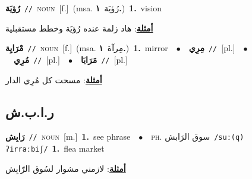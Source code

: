 \documentclass[10pt,a4paper,twoside]{article} %
\begin{document}
\begin{multicols}{2}
{{{{{\setlength\topsep{0pt}\textbf{\foreignlanguage{arabic}{رُؤيَة}}\ {\color{gray}\texttt{//}\color{black}}\ \textsc{noun}\ [f.]\ \color{gray}(msa. \foreignlanguage{arabic}{رُؤيَة}~\foreignlanguage{arabic}{\textbf{١.}})\color{black}\ \textbf{1.}~vision\  \begin{flushright}\color{gray}\foreignlanguage{arabic}{\textbf{\underline{\foreignlanguage{arabic}{أمثلة}}}: هاد زلمة عنده رُؤيَة وخطط مستقبلية}\end{flushright}\color{black}} \vspace{2mm}

{\setlength\topsep{0pt}\textbf{\foreignlanguage{arabic}{مْرَايِة}}\ {\color{gray}\texttt{//}\color{black}}\ \textsc{noun}\ [f.]\ \color{gray}(msa. \foreignlanguage{arabic}{مِرآة}~\foreignlanguage{arabic}{\textbf{١.}})\color{black}\ \textbf{1.}~mirror\ \ $\bullet$\ \ \setlength\topsep{0pt}\textbf{\foreignlanguage{arabic}{مِرِي}}\ {\color{gray}\texttt{//}\color{black}}\ [pl.]\ \ $\bullet$\ \ \setlength\topsep{0pt}\textbf{\foreignlanguage{arabic}{مُرِي}}\ {\color{gray}\texttt{//}\color{black}}\ [pl.]\ \ $\bullet$\ \ \setlength\topsep{0pt}\textbf{\foreignlanguage{arabic}{مَرَايَا}}\ {\color{gray}\texttt{//}\color{black}}\ [pl.]\  \begin{flushright}\color{gray}\foreignlanguage{arabic}{\textbf{\underline{\foreignlanguage{arabic}{أمثلة}}}: مسحت كل مُرِي الدار}\end{flushright}\color{black}} \vspace{2mm}

\vspace{-3mm}
\subsection*{\color{blue}\foreignlanguage{arabic}{ر.ا.ب.ش}\color{blue}{ (ntws)}} 

{\setlength\topsep{0pt}\textbf{\foreignlanguage{arabic}{رَابِش}}\ {\color{gray}\texttt{//}\color{black}}\ \textsc{noun}\ [m.]\ \textbf{1.}~see phrase\ \ $\bullet$\ \ \textsc{ph.} \color{gray} \foreignlanguage{arabic}{سوق الرَابش}\color{black}\ {\color{gray}\texttt{/{\sffamily suː(q) ʔirraːbiʃ}/}\color{black}}\ \textbf{1.}~flea market\  \begin{flushright}\color{gray}\foreignlanguage{arabic}{\textbf{\underline{\foreignlanguage{arabic}{أمثلة}}}: لازمني مشوار لسُوق الرّابِش}\end{flushright}\color{black}} \vspace{2mm}

}}}}
\end{multicols}
\end{document}
